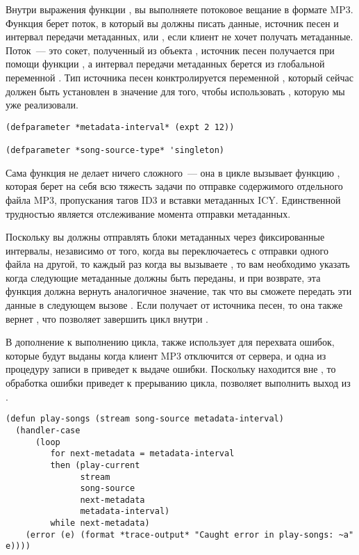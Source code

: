 Внутри выражения  функции , вы выполняете потоковое
вещание в формате MP3.  Функция  берет поток, в который вы должны писать
данные, источник песен и интервал передачи метаданных, или , если клиент не
хочет получать метаданные.  Поток~--- это сокет, полученный из объекта ,
источник песен получается при помощи функции , а интервал передачи
метаданных берется из глобальной переменной .  Тип источника
песен конктролируется переменной , который сейчас должен быть
установлен в значение  для того, чтобы использовать
, которую мы уже реализовали.

\begin{lstlisting}
(defparameter *metadata-interval* (expt 2 12))

(defparameter *song-source-type* 'singleton)
\end{lstlisting}

Сама функция  не делает ничего сложного~--- она в цикле вызывает функцию
, которая берет на себя всю тяжесть задачи по отправке содержимого
отдельного файла MP3, пропускания тагов ID3 и вставки метаданных ICY.  Единственной
трудностью является отслеживание момента отправки метаданных.

Поскольку вы должны отправлять блоки метаданных через фиксированные интервалы, независимо
от того, когда вы переключаетесь с отправки одного файла на другой, то каждый раз когда вы
вызываете , то вам необходимо указать когда следующие метаданные должны
быть переданы, и при возврате, эта функция должна вернуть аналогичное значение, так что вы
сможете передать эти данные в следующем вызове .  Если
 получает  от источника песен, то она также вернет
, что позволяет завершить цикл  внутри .

В дополнение к выполнению цикла,  также использует 
для перехвата ошибок, которые будут выданы когда клиент MP3 отключится от сервера, и одна
из процедуру записи в  приведет к выдаче ошибки. Поскольку
 находится вне , то обработка ошибки приведет к прерыванию
цикла, позволяет выполнить выход из .

\begin{lstlisting}
(defun play-songs (stream song-source metadata-interval)
  (handler-case 
      (loop
         for next-metadata = metadata-interval
         then (play-current 
               stream 
               song-source
               next-metadata
               metadata-interval)
         while next-metadata)
    (error (e) (format *trace-output* "Caught error in play-songs: ~a" e))))
\end{lstlisting}

